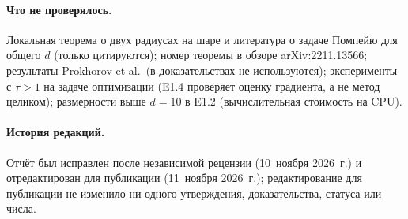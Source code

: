 \documentclass[11pt,a4paper]{article}
\numberwithin{equation}{section}
\theoremstyle{definition}
\theoremstyle{remark}
\begin{document}
\paragraph{Что не проверялось.} Локальная теорема о двух радиусах на шаре и литература о задаче Помпейю для общего $d$ (только цитируются); номер теоремы в обзоре arXiv:2211.13566; результаты Prokhorov et al.\ (в доказательствах не используются); эксперименты с $\tau>1$ на задаче оптимизации (E1.4 проверяет оценку градиента, а не метод целиком); размерности выше $d=10$ в E1.2 (вычислительная стоимость на CPU).

\paragraph{История редакций.} Отчёт был исправлен после независимой рецензии (10~ноября 2026~г.) и отредактирован для публикации (11~ноября 2026~г.); редактирование для публикации не изменило ни одного утверждения, доказательства, статуса или числа.
\end{document}
